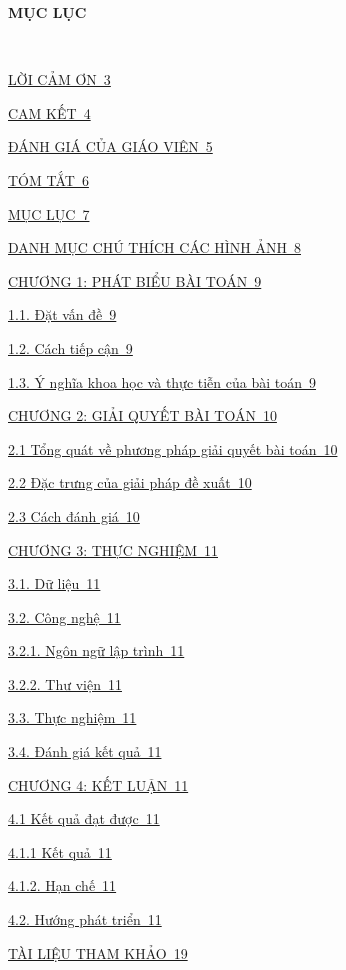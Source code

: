 \newpage
\changefontsizes{16pt}
\centerline{\textbf{MỤC LỤC}}\

\vspace{1.2cm}
\changefontsizes{14pt}
\setlength{\parindent}{0cm}
\hyperlink{page.2}{LỜI CẢM ƠN\dotfill\ 3}

\smallskip
\hyperlink{page.3}{CAM KẾT\dotfill\ 4}

\smallskip
\hyperlink{page.4}{ĐÁNH GIÁ CỦA GIÁO VIÊN\dotfill\ 5}

\smallskip
\hyperlink{page.5}{TÓM TẮT\dotfill\ 6}


\smallskip
\hyperlink{page.6}{MỤC LỤC\dotfill\ 7}

\smallskip
\hyperlink{page.7}{DANH MỤC CHÚ THÍCH CÁC HÌNH ẢNH\dotfill\ 8}

\smallskip
\setlength{\parindent}{0.0cm}
\hyperlink{page.8}{CHƯƠNG 1: PHÁT BIỂU BÀI TOÁN\dotfill\ 9}

\setlength{\parindent}{0.5cm}
\hyperlink{page.8}{1.1. Đặt vấn đề\dotfill\ 9}

\hyperlink{page.9}{1.2. Cách tiếp cận\dotfill\ 9}

\hyperlink{page.9}{1.3. Ý nghĩa khoa học và thực tiễn của bài toán\dotfill\ 9}


\smallskip
\setlength{\parindent}{0.0cm}
\hyperlink{page.10}{CHƯƠNG 2: GIẢI QUYẾT BÀI TOÁN\dotfill\ 10}

\setlength{\parindent}{0.5cm}
\hyperlink{page.10}{2.1 Tổng quát về phương pháp giải quyết bài toán\dotfill\ 10}

\hyperlink{page.10}{2.2 Đặc trưng của giải pháp đề xuất\dotfill\ 10}

\hyperlink{page.10}{2.3 Cách đánh giá\dotfill\ 10}



\smallskip
\setlength{\parindent}{0.0cm}
\hyperlink{page.11}{CHƯƠNG 3: THỰC NGHIỆM\dotfill\ 11}

\setlength{\parindent}{0.5cm}
\hyperlink{page.11}{3.1. Dữ liệu\dotfill\ 11}

\hyperlink{page.11}{3.2. Công nghệ\dotfill\ 11}

\setlength{\parindent}{1cm}
\hyperlink{page.11}{3.2.1. Ngôn ngữ lập trình\dotfill\ 11}

\hyperlink{page.11}{3.2.2. Thư viện\dotfill\ 11}

\setlength{\parindent}{0.5cm}
\hyperlink{page.11}{3.3. Thực nghiệm\dotfill\ 11}

\hyperlink{page.11}{3.4. Đánh giá kết quả\dotfill\ 11}

\smallskip
\setlength{\parindent}{0.0cm}
\hyperlink{page.12}{CHƯƠNG 4: KẾT LUẬN\dotfill\ 11}

\setlength{\parindent}{0.5cm}
\hyperlink{page.12}{4.1 Kết quả đạt được\dotfill\ 11}


\setlength{\parindent}{1cm}
\hyperlink{page.12}{4.1.1 Kết quả\dotfill\ 11}

\hyperlink{page.12}{4.1.2. Hạn chế\dotfill\ 11}

\setlength{\parindent}{0.5cm}
\hyperlink{page.12}{4.2. Hướng phát triển\dotfill\ 11}

\setlength{\parindent}{0.0cm}
\smallskip
\hyperlink{page.13}{TÀI LIỆU THAM KHẢO\dotfill\ 19}